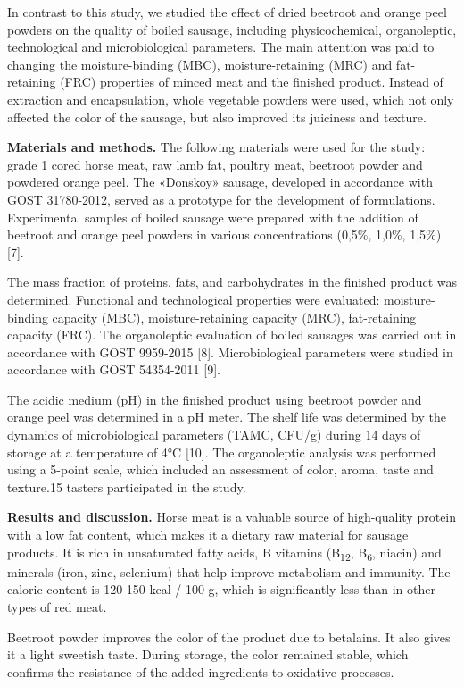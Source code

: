 \begin{multicols}{2}
In contrast to this study, we studied the effect of dried beetroot and
orange peel powders on the quality of boiled sausage, including
physicochemical, organoleptic, technological and microbiological
parameters. The main attention was paid to changing the moisture-binding
(MBC), moisture-retaining (MRC) and fat-retaining (FRC) properties of
minced meat and the finished product. Instead of extraction and
encapsulation, whole vegetable powders were used, which not only
affected the color of the sausage, but also improved its juiciness and
texture.

{\bfseries Materials and methods.} The following materials were used for
the study: grade 1 cored horse meat, raw lamb fat, poultry meat,
beetroot powder and powdered orange peel. The «Donskoy» sausage,
developed in accordance with GOST 31780-2012, served as a prototype for
the development of formulations. Experimental samples of boiled sausage
were prepared with the addition of beetroot and orange peel powders in
various concentrations (0,5\%, 1,0\%, 1,5\%) {[}7{]}.

The mass fraction of proteins, fats, and carbohydrates in the finished
product was determined. Functional and technological properties were
evaluated: moisture-binding capacity (MBC), moisture-retaining capacity
(MRC), fat-retaining capacity (FRC). The organoleptic evaluation of
boiled sausages was carried out in accordance with GOST 9959-2015
{[}8{]}. Microbiological parameters were studied in accordance with GOST
54354-2011 {[}9{]}.

The acidic medium (pH) in the finished product using beetroot powder and
orange peel was determined in a pH meter. The shelf life was determined
by the dynamics of microbiological parameters (TAMC, CFU/g) during 14
days of storage at a temperature of 4°C {[}10{]}. The organoleptic
analysis was performed using a 5-point scale, which included an
assessment of color, aroma, taste and texture.15 tasters participated
in the study.

{\bfseries Results and discussion.} Horse meat is a valuable source of
high-quality protein with a low fat content, which makes it a dietary
raw material for sausage products. It is rich in unsaturated fatty
acids, B vitamins (B\textsubscript{12}, B\textsubscript{6}, niacin) and
minerals (iron, zinc, selenium) that help improve metabolism and
immunity. The caloric content is 120-150 kcal / 100 g, which is
significantly less than in other types of red meat.

Beetroot powder improves the color of the product due to betalains. It
also gives it a light sweetish taste. During storage, the color remained
stable, which confirms the resistance of the added ingredients to
oxidative processes.


\end{multicols}
